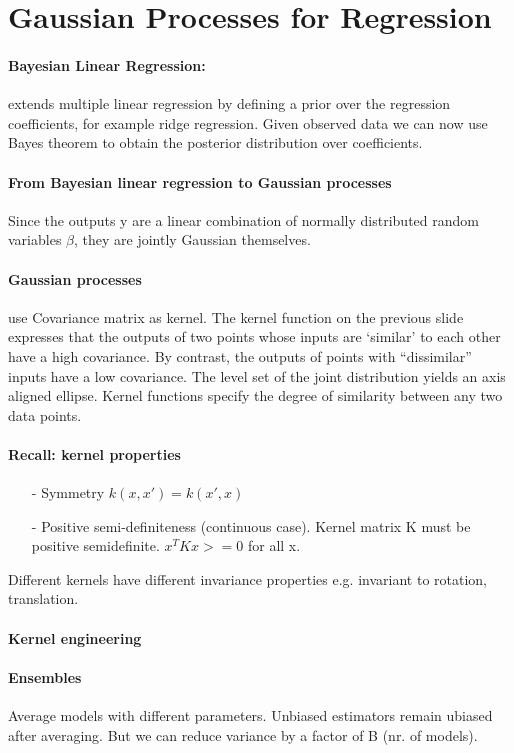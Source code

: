 \section{Gaussian Processes for Regression}

\paragraph{Bayesian Linear Regression: }
extends multiple linear regression by defining a prior over the regression coefficients, for example ridge regression. Given observed data we can now use Bayes theorem to obtain the posterior distribution over coefficients.

\paragraph{From Bayesian linear regression to Gaussian processes}
Since the outputs y are a linear combination of normally distributed random
variables $\beta$, they are jointly Gaussian themselves.

\paragraph{Gaussian processes}
use Covariance matrix as kernel. The kernel function on the previous slide expresses that the outputs of two points whose inputs are ‘similar’ to each other have a high covariance. By contrast, the outputs of points with “dissimilar” inputs have a low covariance. The level set of the joint distribution yields an axis aligned ellipse. Kernel functions specify the degree of similarity between any two data points.

\paragraph{Recall: kernel properties}
\begin{itemize}
    \item[-]Symmetry $k(x,x') = k(x',x)$
    \item[-]Positive semi-definiteness (continuous case). Kernel matrix K must be positive semidefinite. $x^TKx >= 0$ for all x.
\end{itemize}{}

Different kernels have different invariance properties e.g. invariant to rotation, translation.

\paragraph{Kernel engineering}

\paragraph{Ensembles}
Average models with different parameters. Unbiased estimators remain ubiased after averaging. But we can reduce variance by a factor of B (nr. of models).
